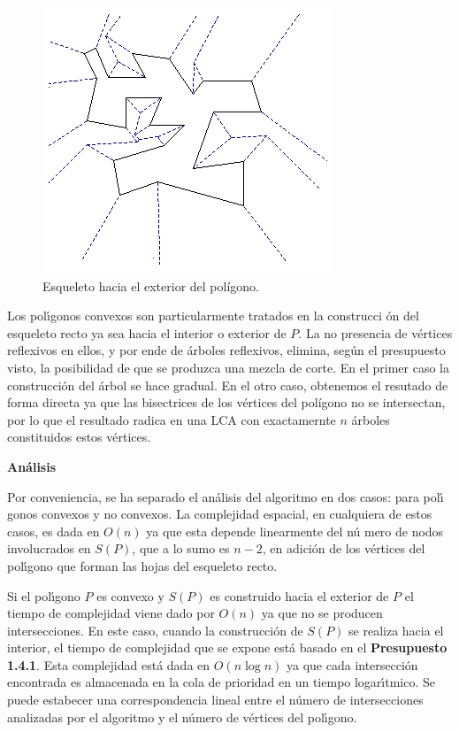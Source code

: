 \documentclass[12pt,english]{report}
\begin{document}
\begin{figure}[htbp]
\begin{center}
\includegraphics{fuera1.png}
\end{center}
\caption{Esqueleto hacia el exterior del pol\'igono.}
\end{figure}

Los pol\'{\i}gonos convexos son particularmente tratados en la construcci%
\'{o}n del esqueleto recto ya sea hacia el interior o exterior de $P$. La no
presencia de v\'{e}rtices reflexivos en ellos, y por ende de \'{a}rboles
reflexivos, elimina, seg\'{u}n el presupuesto visto, la posibilidad de que
se produzca una mezcla de corte. En el primer caso la construcci\'{o}n del 
\'{a}rbol se hace gradual. En el otro caso, obtenemos el resutado de forma
directa ya que las bisectrices de los v\'{e}rtices del pol\'igono no se intersectan, por lo
que el resultado radica en una LCA con exactamernte $n$ \'{a}rboles
constituidos estos v\'{e}rtices.

\begin{flushleft}
\bfseries {\normalsize{An\'alisis}}
\end{flushleft}

Por conveniencia, se ha separado el an\'{a}lisis del algoritmo en dos casos: para pol\'{\i}%
gonos convexos y no convexos. La complejidad espacial, en cualquiera de
estos casos, es dada en $O(n)$ ya que esta depende linearmente del n\'{u}%
mero de nodos involucrados en $S(P)$, que a lo sumo es $n-2$, en adici\'{o}n
de los v\'{e}rtices del pol\'{\i}gono que forman las hojas del esqueleto
recto.

Si el pol\'{\i}gono $P$ es convexo y $S(P)$ es construido hacia el exterior
de $P$ el tiempo de complejidad viene dado por $O(n)$ ya que no se producen
intersecciones. En este caso, cuando la construcci\'{o}n de $S(P)$ se
realiza hacia el interior, el tiempo de complejidad que se expone est\'{a}
basado en el \textbf{Presupuesto 1.4.1}. Esta complejidad est\'{a} dada en $O(n\log n)$ ya que cada intersecci\'{o}n encontrada es almacenada en la cola de prioridad en un
tiempo logar\'{\i}tmico. Se puede estabecer una correspondencia lineal entre
el n\'{u}mero de intersecciones analizadas por el algoritmo y el n\'{u}mero
de v\'{e}rtices del pol\'{\i}gono. 
\end{document}
